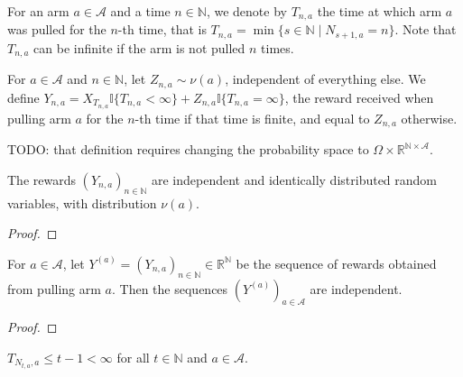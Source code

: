 \begin{definition}\label{def:timeOfPull}
For an arm $a \in \mathcal{A}$ and a time $n \in \mathbb{N}$, we denote by $T_{n,a}$ the time at which arm $a$ was pulled for the $n$-th time, that is $T_{n,a} = \min\{s \in \mathbb{N} \mid N_{s+1,a} = n\}$.
Note that $T_{n, a}$ can be infinite if the arm is not pulled $n$ times.
\end{definition}


\begin{definition}\label{def:altReward}
For $a \in \mathcal{A}$ and $n \in \mathbb{N}$, let $Z_{n,a} \sim \nu(a)$, independent of everything else.
We define $Y_{n, a} = X_{T_{n,a}} \mathbb{I}\{T_{n, a} < \infty\} + Z_{n,a} \mathbb{I}\{T_{n, a} = \infty\}$, the reward received when pulling arm $a$ for the $n$-th time if that time is finite, and equal to $Z_{n,a}$ otherwise.
\end{definition}

TODO: that definition requires changing the probability space to $\Omega \times \mathbb{R}^{\mathbb{N} \times \mathcal{A}}$.

\begin{lemma}\label{lem:iid_altReward}
The rewards $(Y_{n,a})_{n \in \mathbb{N}}$ are independent and identically distributed random variables, with distribution $\nu(a)$.
\end{lemma}

\begin{proof}

\end{proof}


\begin{lemma}\label{lem:indepednent_algReward}
For $a \in \mathcal{A}$, let $Y^{(a)} = (Y_{n,a})_{n \in \mathbb{N}} \in \mathbb{R}^{\mathbb{N}}$ be the sequence of rewards obtained from pulling arm $a$. Then the sequences $(Y^{(a)})_{a \in \mathcal{A}}$ are independent.
\end{lemma}

\begin{proof}

\end{proof}


\begin{lemma}\label{lem:timeOfPull_pullCount_le}
$T_{N_{t, a}, a} \le t - 1 < \infty$ for all $t \in \mathbb{N}$ and $a \in \mathcal{A}$.
\end{lemma}


